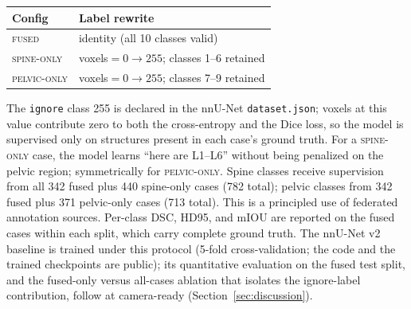 \documentclass[pmlr]{jmlr}
\begin{document}
\begin{center}
\begin{tabular}{@{}ll@{}}
\toprule
\textbf{Config} & \textbf{Label rewrite} \\
\midrule
\textsc{fused}        & identity (all 10 classes valid) \\
\textsc{spine-only}   & voxels$=0 \rightarrow 255$;
                        classes 1--6 retained \\
\textsc{pelvic-only}  & voxels$=0 \rightarrow 255$;
                        classes 7--9 retained \\
\bottomrule
\end{tabular}
\end{center}

The \texttt{ignore} class 255 is declared in the nnU-Net
\texttt{dataset.json}; voxels at this value contribute zero to both
the cross-entropy and the Dice loss, so the model is supervised
only on structures present in each case's ground truth.
For a \textsc{spine-only} case, the model learns ``here are L1--L6''
without being penalized on the pelvic region; symmetrically for
\textsc{pelvic-only}.
Spine classes receive supervision from all 342 fused plus 440
spine-only cases (782 total); pelvic classes from 342 fused plus
371 pelvic-only cases (713 total).
This is a principled use of federated annotation sources.
Per-class DSC, HD95, and mIOU are reported on the fused cases within
each split, which carry complete ground truth.
The nnU-Net v2 baseline is trained under this protocol (5-fold
cross-validation; the code and the trained checkpoints are public);
its quantitative evaluation on the fused test split, and the
fused-only versus all-cases ablation that isolates the ignore-label
contribution, follow at camera-ready
(Section~\ref{sec:discussion}).
\end{document}
